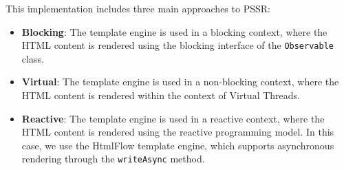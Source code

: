 This implementation includes three main approaches to PSSR\@:
\begin{itemize}
      \item \textbf{Blocking}: The template engine is used in a blocking context,
            where the HTML content is rendered using the blocking interface of the
            \texttt{Observable} class.
      \item \textbf{Virtual}: The template engine is used in a non-blocking context,
            where the HTML content is rendered within the context of Virtual Threads.
      \item \textbf{Reactive}: The template engine is used in a reactive context,
            where the HTML content is rendered using the reactive programming model.
            In this case, we use the HtmlFlow template engine, which
            supports asynchronous rendering through the \texttt{writeAsync} method.
\end{itemize}